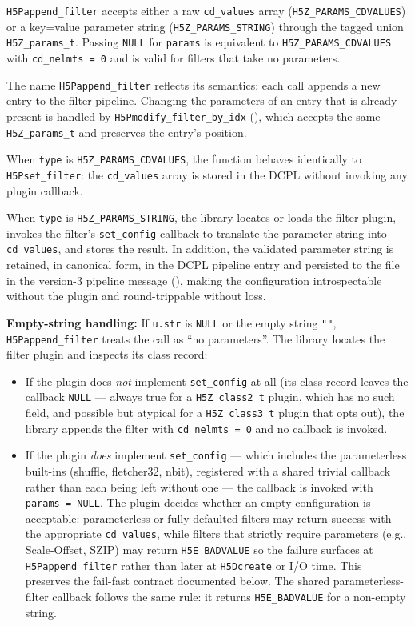 \documentclass[../RFC-HDFG-2026-001.tex]{subfiles}
\begin{document}
\texttt{H5Pappend\_filter} accepts either a raw \texttt{cd\_values} array
(\texttt{H5Z\_PARAMS\_CDVALUES}) or a key=value parameter string
(\texttt{H5Z\_PARAMS\_STRING}) through the tagged union \texttt{H5Z\_params\_t}.
Passing \texttt{NULL} for \texttt{params} is equivalent to
\texttt{H5Z\_PARAMS\_CDVALUES} with \texttt{cd\_nelmts = 0} and is valid for
filters that take no parameters.

The name \texttt{H5Pappend\_filter} reflects its semantics: each call appends
a new entry to the filter pipeline.  Changing the parameters of an entry that
is already present is handled by \texttt{H5Pmodify\_filter\_by\_idx}
(), which accepts the same
\texttt{H5Z\_params\_t} and preserves the entry's position.

When \texttt{type} is \texttt{H5Z\_PARAMS\_CDVALUES}, the function behaves
identically to \texttt{H5Pset\_filter}: the \texttt{cd\_values} array is stored
in the DCPL without invoking any plugin callback.

When \texttt{type} is \texttt{H5Z\_PARAMS\_STRING}, the library locates or
loads the filter plugin, invokes the filter's \texttt{set\_config} callback to
translate the parameter string into \texttt{cd\_values}, and stores the result.
In addition, the validated parameter string is retained, in canonical form, in the DCPL
pipeline entry and persisted to the file in the version-3 pipeline message
(), making the configuration introspectable without
the plugin and round-trippable without loss.

\textbf{Empty-string handling:} If \texttt{u.str} is \texttt{NULL} or the empty
string \texttt{""}, \texttt{H5Pappend\_filter} treats the call as ``no
parameters''. The library locates the filter plugin and inspects its class
record:
\begin{itemize}
\item If the plugin does \emph{not} implement \texttt{set\_config} at all
  (its class record leaves the callback \texttt{NULL} --- always true for
  a \texttt{H5Z\_class2\_t} plugin, which has no such field, and possible
  but atypical for a \texttt{H5Z\_class3\_t} plugin that opts out), the
  library appends the filter with \texttt{cd\_nelmts~=~0} and no callback
  is invoked.
\item If the plugin \emph{does} implement \texttt{set\_config} --- which
  includes the parameterless built-ins (shuffle, fletcher32, nbit),
  registered with a shared trivial callback rather than each being left
  without one --- the callback is invoked with \texttt{params~=~NULL}.
  The plugin decides whether an empty configuration is acceptable:
  parameterless or fully-defaulted filters may return success with the
  appropriate \texttt{cd\_values}, while filters that strictly require
  parameters (e.g., Scale-Offset, SZIP) may return \texttt{H5E\_BADVALUE}
  so the failure surfaces at \texttt{H5Pappend\_filter} rather than later
  at \texttt{H5Dcreate} or I/O time. This preserves the fail-fast contract
  documented below. The shared parameterless-filter callback follows the
  same rule: it returns \texttt{H5E\_BADVALUE} for a non-empty string.
\end{itemize}
\end{document}
